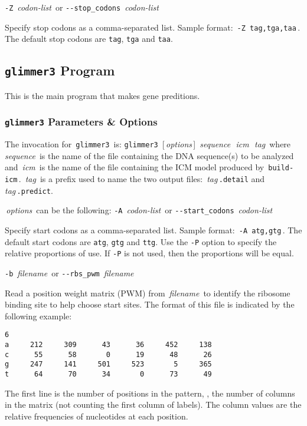 \documentclass[fleqn,titlepage,11pt]{article}
\def\Desc#1{\,\mbox{\emph{#1}}\,}
\def\Pg#1{\texttt{#1}}
\begin{document}
\exdent
  \verb`-Z` \Desc{codon-list} \enskip or \enskip \verb`--stop_codons` \Desc{codon-list}

  Specify stop codons as a comma-separated list.
  Sample format:  \,\verb`-Z tag,tga,taa`\,.
  The default stop codons are \Pg{tag}, \Pg{tga} and \Pg{taa}.
\el

\subsection{\Pg{glimmer3} Program}

This is the main program that makes gene preditions.

\subsubsection{\Pg{glimmer3} Parameters \& Options}
The invocation for \,\Pg{glimmer3}\, is:
\bq
  \Pg{glimmer3}\, [\Desc{options}] \Desc{sequence} \Desc{icm} \Desc{tag}
\eq
where \Desc{sequence} is the name of the file containing the DNA
sequence(s) to be analyzed and \Desc{icm} is the name of the file
containing the ICM model produced by \,\verb`build-icm`\,.  \Desc{tag}
is a prefix used to name the two output files:  \Desc{tag}\verb`.detail`
and \Desc{tag}\verb`.predict`.

\Desc{options} can be the following:
\bl{}\RaggedRight
\exdent
  \verb`-A` \Desc{codon-list} \enskip or \enskip \verb`--start_codons` \Desc{codon-list}

  Specify start codons as a comma-separated list.
  Sample format:  \,\verb`-A atg,gtg`\,.
  The default start codons are \Pg{atg}, \Pg{gtg} and \Pg{ttg}.
  Use the \Pg{-P} option to specify the relative proportions of use.
  If \Pg{-P} is not used, then the proportions will be equal.

\exdent
  \verb`-b` \Desc{filename} \enskip or \enskip \verb`--rbs_pwm` \Desc{filename}

  Read a position weight matrix (PWM) from \Desc{filename} to identify
  the ribosome binding site to help choose start sites.  The format of
  this file is indicated by the following example:
\BSV
\begin{verbatim}
6
a     212     309      43      36     452     138
c      55      58       0      19      48      26
g     247     141     501     523       5     365
t      64      70      34       0      73      49
\end{verbatim}
\ESV
  The first line is the number of positions in the pattern, \ie,
  the number of columns in the matrix (not counting
  the first column of labels).  The column values are the relative
  frequencies of nucleotides at each position.
\end{document}
